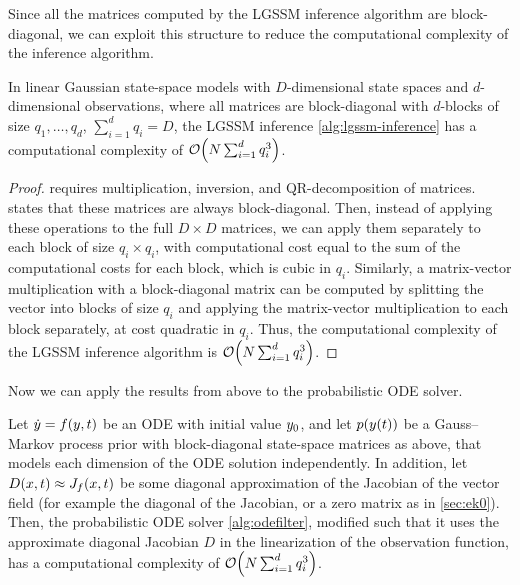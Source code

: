 \documentclass{mimosis}
\begin{document}
\par
Since all the matrices computed by the LGSSM inference algorithm are block-diagonal, we can exploit this structure to reduce the computational complexity of the inference algorithm.

\begin{corollary}
In linear Gaussian state-space models with
\(D\)-dimensional state spaces and \(d\)-dimensional observations,
where all matrices are block-diagonal with \(d\)-blocks of size
\(q_1, \dots, q_d\),
\(\sum_{i=1}^d q_i = D\),
the LGSSM inference \cref{alg:lgssm-inference} has a computational complexity of
\(\order{N \sum_{i=1}^d q_i^3}\).
\label{cor:bd-complexity}
\end{corollary}

\begin{proof}
 requires multiplication, inversion, and QR-decomposition of matrices.
 states that these matrices are always block-diagonal.
Then, instead of applying these operations to the full \(D \times D\) matrices, we can apply them separately to each block of size \(q_i \times q_i\),
with computational cost equal to the sum of the computational costs for each block, which is cubic in \(q_i\).
Similarly, a matrix-vector multiplication with a block-diagonal matrix can be computed by splitting the vector into blocks of size \(q_i\) and applying the matrix-vector multiplication to each block separately, at cost quadratic in \(q_i\).
Thus, the computational complexity of the LGSSM inference algorithm is \(\order{N \sum_{i=1}^d q_i^3}\).
\end{proof}

\par
Now we can apply the results from above to the probabilistic ODE solver.

\begin{proposition}
Let \(\dot{\val} = \vf(\val, t)\) be an ODE with initial value \(y_0\),
and let \(\p( \val(t) )\) be a Gauss--Markov process prior with block-diagonal state-space matrices as above, that models each dimension of the ODE solution independently.
In addition, let \(D(\st, t) \approx \jac{\vf}(\st, t)\) be some diagonal approximation of the Jacobian of the vector field (for example the diagonal of the Jacobian, or a zero matrix as in \cref{sec:ek0}).
Then, the probabilistic ODE solver
\cref{alg:odefilter},
modified such that it uses the approximate diagonal Jacobian \(D\) in the linearization of the observation function,
has a computational complexity of
\(\order{N \sum_{i=1}^d q_i^3}\).
\label{prop:highdim:bdcomplexity}
\end{proposition}
\end{document}

